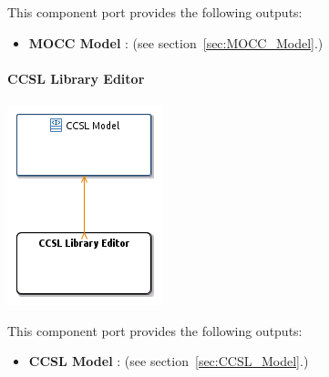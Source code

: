 \documentclass{gemoc} %
\begin{document}
This component port provides the following outputs:
\begin{itemize}
  \item \textbf{MOCC Model} :
(see section~\ref{sec:MOCC_Model}.)
\end{itemize}

\paragraph{CCSL Library Editor}
\label{sec:CCSL_Library_Editor}


\begin{center}
\includegraphics*[trim=0.0cm 0.0cm 0cm 0.0cm, clip=true]{../images/generated/Generated_CCSL_Library_Editor.png}
\end{center}


This component port provides the following outputs:
\begin{itemize}
  \item \textbf{CCSL Model} :
(see section~\ref{sec:CCSL_Model}.)
\end{itemize}
\end{document}
